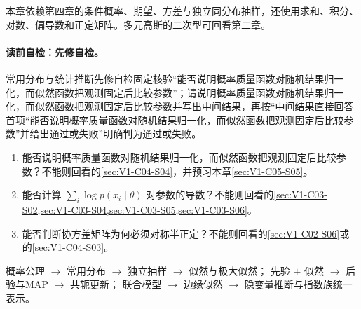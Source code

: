 \label{struct:V1-C05-CH02}
\begin{prerequisitebox}
本章依赖第四章的条件概率、期望、方差与独立同分布抽样，还使用求和、积分、对数、偏导数和正定矩阵。多元高斯的二次型可回看第二章。
\end{prerequisitebox}

\label{struct:V1-C05-CH03}
\paragraph{读前自检：先修自检。}常用分布与统计推断先修自检固定核验“能否说明概率质量函数对随机结果归一化，而似然函数把观测固定后比较参数”；请说明概率质量函数对随机结果归一化，而似然函数把观测固定后比较参数并写出中间结果，再按“中间结果直接回答首项“能否说明概率质量函数对随机结果归一化，而似然函数把观测固定后比较参数”并给出通过或失败”明确判为通过或失败。\par

\begin{precheckbox}
\begin{enumerate}[leftmargin=2.2em]
  \item 能否说明概率质量函数对随机结果归一化，而似然函数把观测固定后比较参数？不能则回看的\cref{sec:V1-C04-S04}，并预习本章\cref{sec:V1-C05-S05}。
  \item 能否计算 $\sum_i\log p(x_i\mid\theta)$ 对参数的导数？不能则回看的\cref{sec:V1-C03-S02,sec:V1-C03-S04,sec:V1-C03-S05,sec:V1-C03-S06}。
  \item 能否判断协方差矩阵为何必须对称半正定？不能则回看的\cref{sec:V1-C02-S06}或的\cref{sec:V1-C04-S03}。
\end{enumerate}
\end{precheckbox}

\label{struct:V1-C05-CH04}
\begin{dependencybox}
概率公理 $\to$ 常用分布 $\to$ 独立抽样 $\to$ 似然与极大似然；
先验 $+$ 似然 $\to$ 后验与MAP $\to$ 共轭更新；
联合模型 $\to$ 边缘似然 $\to$ 隐变量推断与指数族统一表示。
\end{dependencybox}

\label{struct:V1-C05-CH05}
